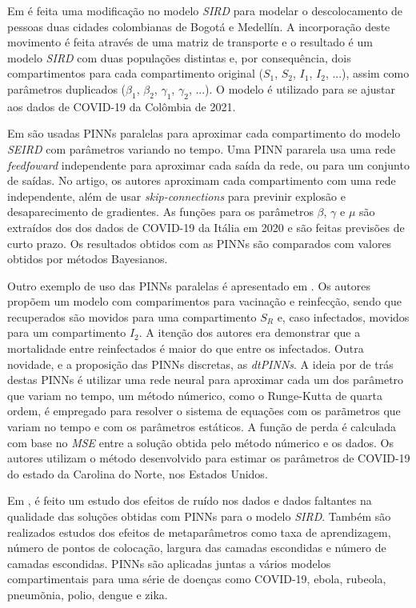 Em \cite{ogueda-oliva:23-colombia-duas-cidades} é feita uma modificação no
modelo \textit{SIRD} para modelar o descolocamento de pessoas duas 
cidades colombianas de Bogotá e Medellín. A incorporação deste movimento 
é feita através de uma matriz de transporte e o resultado é um modelo \textit{SIRD}
com duas populações distintas e, por consequência, dois compartimentos para cada
compartimento original ($S_1$, $S_2$, $I_1$, $I_2$, ...), assim como parâmetros 
duplicados ($\beta_1$, $\beta_2$, $\gamma_1$, $\gamma_2$, ...). O modelo é utilizado
para se ajustar aos dados de COVID-19 da Colômbia de 2021.

Em \cite{ning-etal:23-pinns-paralelas} são usadas PINNs paralelas para aproximar
cada compartimento do modelo \textit{SEIRD} com parâmetros variando no tempo.
Uma PINN pararela usa uma rede \textit{feedfoward} independente para aproximar 
cada saída da rede, ou para um conjunto de saídas. 
No artigo, os autores aproximam cada compartimento com uma rede independente, 
além de usar \textit{skip-connections} para previnir explosão e desaparecimento
de gradientes. 
As funções para os parâmetros $\beta$, $\gamma$ e $\mu$ são extraídos dos dos 
dados de COVID-19 da Itália em 2020 e são feitas previsões de curto prazo.
Os resultados obtidos com as PINNs são comparados com valores obtidos por métodos
Bayesianos. 

Outro exemplo de uso das PINNs paralelas é apresentado em  
\cite{yang-etal:25-dtpinns-paralelas}. Os autores propõem um modelo com 
comparimentos para vacinação e reinfecção, sendo que recuperados são movidos 
para uma compartimento $S_R$ e, caso infectados, movidos para um compartimento 
$I_2$. 
A itenção dos autores era demonstrar que a mortalidade entre reinfectados é maior 
do que entre os infectados.
Outra novidade, e a proposição das PINNs discretas, as \textit{dtPINNs}. A ideia
por de trás destas PINNs é utilizar uma rede neural para aproximar cada um dos 
parâmetro que variam no tempo, um método númerico, como o Runge-Kutta de quarta
ordem, é empregado para resolver o sistema de equações com os parãmetros que 
variam no tempo e com os parâmetros estáticos. 
A função de perda é calculada com base no \textit{MSE} entre a solução obtida pelo
método númerico e os dados. 
Os autores utilizam o método desenvolvido para estimar os parâmetros de COVID-19
do estado da Carolina do Norte, nos Estados Unidos.      

Em \cite{shaier-etal:22-dinns}, é feito um estudo dos efeitos de ruído nos dados
e dados faltantes na qualidade das soluções obtidas com PINNs para o modelo 
\textit{SIRD}.
Também  são realizados estudos dos efeitos de metaparâmetros como taxa de 
aprendizagem, número de pontos de colocação, largura das camadas escondidas e 
número de camadas escondidas.
PINNs são aplicadas juntas a vários modelos compartimentais para uma série de 
doenças como COVID-19, ebola, rubeola, pneumõnia, polio, dengue e zika. 

